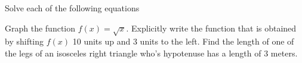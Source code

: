 \documentclass[11pt]{exam}
\begin{document}
\begin{questions}
\addpoints
\question Solve each of the following equations

\newpage

\question[15] Graph the function $f(x) = \sqrt{x}$. Explicitly write the function that is obtained by shifting $f(x)$ 10 units up and 3 units to the left.
\vfill
\question[15] Find the length of one of the legs of an isosceles right triangle who's hypotenuse has a length of 3 meters.
\vfill

\end{questions}
\end{document}
